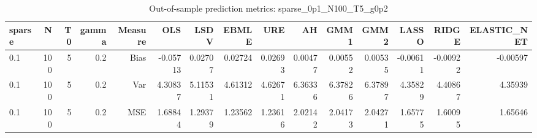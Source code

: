 \begin{table}[!htbp]\centering
\caption{Out-of-sample prediction metrics: sparse_0p1_N100_T5_g0p2}
\label{tab:table3_sparse_0p1_N100_T5_g0p2}
\begin{tabular}{lrrrrrrrrrrrrrr}
\hline
sparse & N & T0 & gamma & Measure & OLS & LSDV & EBMLE & URE & AH & GMM1 & GMM2 & LASSO & RIDGE & ELASTIC_NET \\
\hline
0.1 & 100 & 5 & 0.2 & Bias & -0.05713 & 0.02707 & 0.02724 & 0.02693 & 0.00477 & 0.00552 & 0.00535 & -0.00611 & -0.00922 & -0.00597 \\
0.1 & 100 & 5 & 0.2 & Var & 4.30837 & 5.11531 & 4.61312 & 4.62671 & 6.36336 & 6.37826 & 6.37897 & 4.35829 & 4.40867 & 4.35939 \\
0.1 & 100 & 5 & 0.2 & MSE & 1.68844 & 1.29379 & 1.23562 & 1.23616 & 2.02142 & 2.04173 & 2.04271 & 1.65775 & 1.60095 & 1.65646 \\
\hline
\end{tabular}
\end{table}

